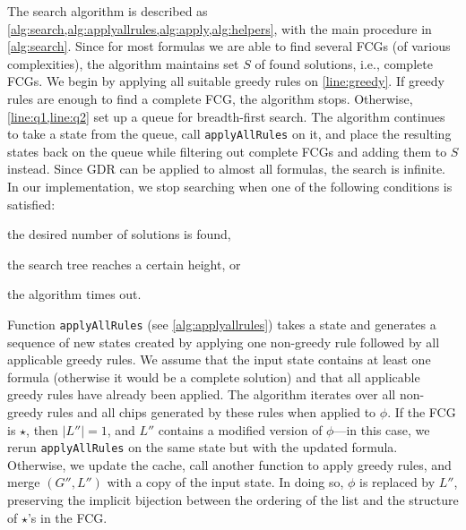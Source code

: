 The search algorithm is described as
\cref{alg:search,alg:applyallrules,alg:apply,alg:helpers}, with the main
procedure in \cref{alg:search}. Since for most formulas we are able to find
several FCGs (of various complexities), the algorithm maintains set $S$ of found
solutions, i.e., complete FCGs. We begin by applying all suitable greedy rules
on \cref{line:greedy}. If greedy rules are enough to find a complete FCG, the
algorithm stops. Otherwise, \cref{line:q1,line:q2} set up a queue for
breadth-first search. The algorithm continues to take a state from the queue,
call \texttt{applyAllRules} on it, and place the resulting states back on the
queue while filtering out complete FCGs and adding them to $S$ instead. Since
GDR can be applied to almost all formulas, the search is infinite. In our
implementation, we stop searching when one of the following conditions is
satisfied:
\begin{enumerate*}[label=(\emph{\alph*})]
  \item the desired number of solutions is found,
  \item the search tree reaches a certain height, or
  \item the algorithm times out.
\end{enumerate*}

Function \texttt{applyAllRules} (see \cref{alg:applyallrules}) takes a state and
generates a sequence of new states created by applying one non-greedy rule
followed by all applicable greedy rules. We assume that the input state contains
at least one formula (otherwise it would be a complete solution) and that all
applicable greedy rules have already been applied. The algorithm iterates over
all non-greedy rules and all chips generated by these rules when applied to
$\phi$. If the FCG is $\star$, then $|L''| = 1$, and $L''$ contains a modified
version of $\phi$---in this case, we rerun \texttt{applyAllRules} on the same
state but with the updated formula. Otherwise, we update the cache, call another
function to apply greedy rules, and merge $(G'', L'')$ with a copy of the input
state. In doing so, $\phi$ is replaced by $L''$, preserving the implicit
bijection between the ordering of the list and the structure of $\star$'s in the
FCG\@.

